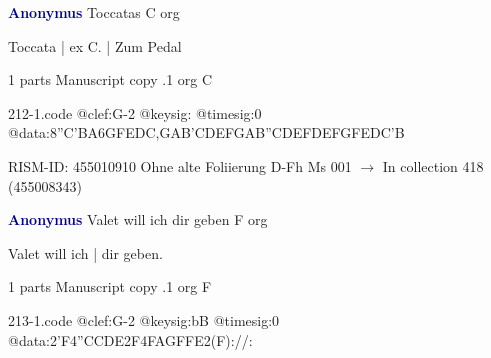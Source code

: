 \documentclass[twocolumn]{book}
\begin{document}
\newline \par \vspace{7pt} \textcolor{darkblue}{\textbf{Anonymus  }}
\newline Toccatas  C  
\newline org
\newline \begin{itshape}[f.49v, at left:] Toccata | ex C. | Zum Pedal\end{itshape} 
\newline \textcolor{darkblue}{}  1 parts  
\newline Manuscript copy
.1  org  C  
\begin{filecontents*}{212-1.code}
@clef:G-2
@keysig:
@timesig:0
@data:8''C{'BA}{6GFED}{C,GAB}{'CDEF}{GAB''C}{DEFD}{EFGF}{EDC'B}
\end{filecontents*}
\newline
%

\newline RISM-ID: 455010910
\newline Ohne alte Foliierung
\newline D-Fh  Ms 001
\newline $\rightarrow$ In collection 418 (455008343)

\newline \par \vspace{7pt} \textcolor{darkblue}{\textbf{Anonymus  }}
\newline Valet will ich dir geben  F  
\newline org
\newline \begin{itshape}[f.35v, at left:] Valet will ich | dir geben.\end{itshape} 
\newline \textcolor{darkblue}{}  1 parts  
\newline Manuscript copy
.1  org  F  
\begin{filecontents*}{213-1.code}
@clef:G-2
@keysig:bB
@timesig:0
@data:2'F4''CCDE2F4FAGFFE2(F)://:
\end{filecontents*}
\newline
%
\end{document}
